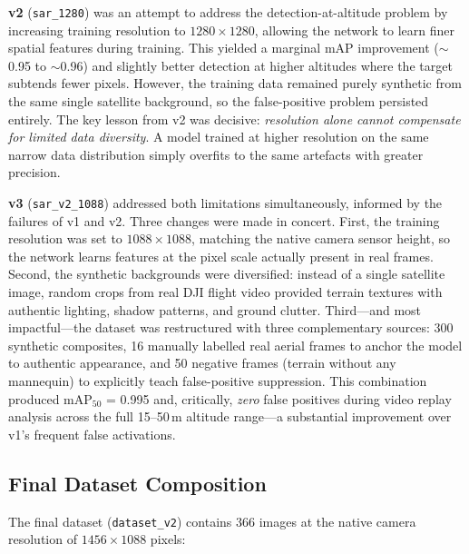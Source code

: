 \documentclass[10pt,a4paper]{article}
\begin{document}
\textbf{v2} (\texttt{sar\_1280}) was an attempt to address the detection-at-altitude problem by increasing training resolution to $1280 \times 1280$, allowing the network to learn finer spatial features during training. This yielded a marginal mAP improvement (${\sim}$0.95 to ${\sim}$0.96) and slightly better detection at higher altitudes where the target subtends fewer pixels. However, the training data remained purely synthetic from the same single satellite background, so the false-positive problem persisted entirely. The key lesson from v2 was decisive: \emph{resolution alone cannot compensate for limited data diversity}. A model trained at higher resolution on the same narrow data distribution simply overfits to the same artefacts with greater precision.

\textbf{v3} (\texttt{sar\_v2\_1088}) addressed both limitations simultaneously, informed by the failures of v1 and v2. Three changes were made in concert. First, the training resolution was set to $1088 \times 1088$, matching the native camera sensor height, so the network learns features at the pixel scale actually present in real frames. Second, the synthetic backgrounds were diversified: instead of a single satellite image, random crops from real DJI flight video provided terrain textures with authentic lighting, shadow patterns, and ground clutter. Third---and most impactful---the dataset was restructured with three complementary sources: 300 synthetic composites, 16 manually labelled real aerial frames to anchor the model to authentic appearance, and 50 negative frames (terrain without any mannequin) to explicitly teach false-positive suppression. This combination produced mAP$_{50}$ = 0.995 and, critically, \emph{zero} false positives during video replay analysis across the full 15--50\,m altitude range---a substantial improvement over v1's frequent false activations.

\subsection{Final Dataset Composition}

The final dataset (\texttt{dataset\_v2}) contains 366 images at the native camera resolution of $1456 \times 1088$ pixels:
\end{document}
